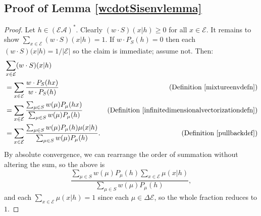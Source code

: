 \documentclass[twoside]{article}
\begin{document}
\subsection{Proof of Lemma \ref{wcdotSisenvlemma}}
\begin{proof}
    Let $h\in(\mathcal E\mathcal A)^*$.
    Clearly $(w\cdot S)(x|h)\geq 0$ for all $x\in\mathcal E$.
    It remains to show $\sum_{x\in\mathcal E}(w\cdot S)(x|h)=1$.
    If $w\cdot P_{S}(h)=0$ then each $(w\cdot S)(x|h)=1/|\mathcal E|$
    so the claim is immediate; assume not. Then:
    \begin{align*}
        &{} \sum_{x\in\mathcal E}(w\cdot S)(x|h)\\
            &= \sum_{x\in\mathcal E}\frac{w\cdot P_{S}(hx)}{w\cdot P_{S}(h)}
                &\mbox{(Definition \ref{mixtureenvdefn})}\\
            &= \sum_{x\in\mathcal E}
                \frac{
                    \sum_{\mu\in S}w(\mu)P_\mu(hx)
                }{
                    \sum_{\mu\in S}w(\mu)P_\mu(h)
                }
                &\mbox{(Definition \ref{infinitedimensionalvectorizationdefn})}\\
            &= \sum_{x\in\mathcal E}
                \frac{
                    \sum_{\mu\in S}w(\mu)P_\mu(h)\mu(x|h)
                }{
                    \sum_{\mu\in S}w(\mu)P_\mu(h)
                }.
                &\mbox{(Definition \ref{pullbackdef})}
    \end{align*}
    By absolute convergence, we can rearrange the order of summation without
    altering the sum, so the above is
    \[
        \frac{
            \sum_{\mu\in S}w(\mu)P_\mu(h)\sum_{x\in\mathcal E}\mu(x|h)
        }{
            \sum_{\mu\in S}w(\mu)P_\mu(h)
        },
    \]
    and each $\sum_{x\in\mathcal E}\mu(x|h)=1$ since each $\mu\in\Delta\mathcal E$,
    so the whole fraction reduces to $1$.
\end{proof}
\end{document}
